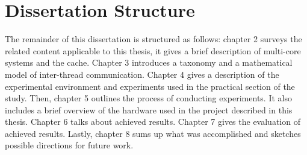 \section{Dissertation Structure}
The remainder of this dissertation is structured as follows: chapter 2 surveys the related content applicable to this thesis, it gives a brief description of multi-core systems and the cache. Chapter 3 introduces a taxonomy and a mathematical model of inter-thread communication. Chapter 4 gives a description of the experimental environment and experiments used in the practical section of the study. Then, chapter 5 outlines the process of conducting experiments. It also includes a brief overview of the hardware used in the project described in this thesis. Chapter 6 talks about achieved results. Chapter 7 gives the evaluation of achieved results. Lastly, chapter 8 sums up what was accomplished and sketches possible directions for future work.







